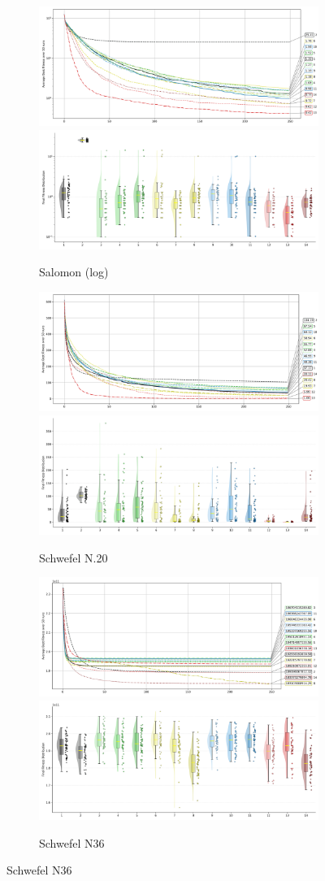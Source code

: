 \begin{figure}[p]
\begin{subfigure}{1\textwidth}
    \centering
    \includegraphics[width=.49\textwidth]{Figures/results/500/Salomon_All_selected_algorithms_dim500_annot_legend.png}
    \includegraphics[width=.49\textwidth]{Figures/results/500/Salomon_all_dim500_raincloud_vertical.png}
    \caption{Salomon (log)}
\end{subfigure}

\begin{subfigure}{1\textwidth}
    \centering
    \includegraphics[width=.49\textwidth]{Figures/results/500/Schwefel_N20_All_selected_algorithms_dim500_annot_legend.png}
    \includegraphics[width=.49\textwidth]{Figures/results/500/Schwefel_N20_all_dim500_raincloud_vertical.png}
    \caption{Schwefel N.20}
\end{subfigure}

\begin{subfigure}{1\textwidth}
    \centering
    \includegraphics[width=.49\textwidth]{Figures/results/500/Schwefel_N36_All_selected_algorithms_dim500_annot_legend.png}
    \includegraphics[width=.49\textwidth]{Figures/results/500/Schwefel_N36_all_dim500_raincloud_vertical.png}
    \caption{Schwefel N36}
\end{subfigure}


\end{figure}
